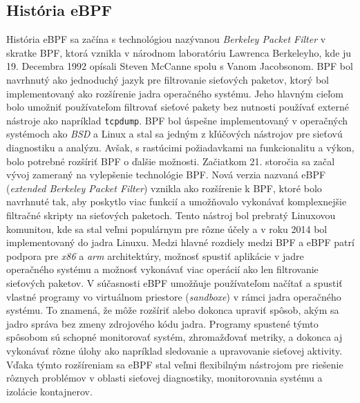 \subsection{História eBPF}
História eBPF sa začína s technológiou nazývanou \emph{Berkeley Packet Filter} v skratke BPF, ktorá vznikla v národnom laboratóriu Lawrenca Berkeleyho, 
kde ju 19. Decembra 1992 opísali Steven McCanne spolu s Vanom Jacobsonom. BPF bol navrhnutý ako jednoduchý jazyk pre filtrovanie sieťových paketov, 
ktorý bol implementovaný ako rozšírenie jadra operačného systému. Jeho hlavným cieľom bolo umožniť používateľom filtrovať sieťové pakety bez nutnosti 
používať externé nástroje ako napríklad \texttt{tcpdump}. BPF bol úspešne implementovaný v operačných systémoch ako \emph{BSD} a Linux a stal sa jedným z 
kľúčových nástrojov pre sieťovú diagnostiku a analýzu. Avšak, s rastúcimi požiadavkami na funkcionalitu a výkon, bolo potrebné rozšíriť BPF o ďalšie možnosti. 
Začiatkom 21. storočia sa začal vývoj zameraný na vylepšenie technológie BPF. Nová verzia nazvaná eBPF (\emph{extended Berkeley Packet Filter}) vznikla ako 
rozšírenie k BPF, ktoré bolo navrhnuté tak, aby poskytlo viac funkcií a umožňovalo vykonávať komplexnejšie filtračné skripty na sieťových paketoch. 
Tento nástroj bol prebratý Linuxovou komunitou, kde sa stal veľmi populárnym pre rôzne účely a v roku 2014 bol implementovaný do jadra Linuxu. 
Medzi hlavné rozdiely medzi BPF a eBPF patrí podpora pre \emph{x86} a \emph{arm} architektúry, možnosť spustiť aplikácie v jadre operačného systému a možnosť 
vykonávať viac operácií ako len filtrovanie sieťových paketov. V súčasnosti eBPF umožňuje používateľom načítať a spustiť vlastné programy vo 
virtuálnom priestore (\emph{sandboxe}) v rámci jadra operačného systému. To znamená, že môže rozšíriť alebo dokonca upraviť spôsob, akým sa jadro správa 
bez zmeny zdrojového kódu jadra. Programy spustené týmto spôsobom sú schopné monitorovať systém, zhromažďovať metriky, a dokonca aj vykonávať 
rôzne úlohy ako napríklad sledovanie a upravovanie sieťovej aktivity. Vďaka týmto rozšíreniam sa eBPF stal veľmi flexibilným nástrojom pre 
riešenie rôznych problémov v oblasti sieťovej diagnostiky, monitorovania systému a izolácie kontajnerov.~\cite{eBPF, history, wiki} 

